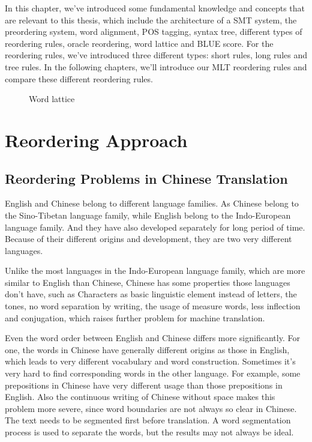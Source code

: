 In this chapter, we've introduced some fundamental knowledge and concepts that are relevant to this thesis, which include the architecture of a SMT system, the preordering system, word alignment, POS tagging, syntax tree, different types of reordering rules, oracle reordering, word lattice and BLUE score. For the reordering rules, we've introduced three different types: short rules, long rules and tree rules. In the following chapters, we'll introduce our MLT reordering rules and compare these different reordering rules.

\begin{landscape}
\begin{figure}
\centering

\caption{Word lattice}
\label{Lattices}
\end{figure}
\end{landscape}

\chapter{Reordering Approach}
\label{ch:ReorderingApproach}

\section{Reordering Problems in Chinese Translation}
\label{ch:ReorderingApproach:sec:Problem}

English and Chinese belong to different language families. As Chinese belong to the Sino-Tibetan language family, while English belong to the Indo-European language family. And they have also developed separately for long period of time. Because of their different origins and development, they are two very different languages.

Unlike the most languages in the Indo-European language family, which are more similar to English than Chinese, Chinese has some properties those languages don't have, such as Characters as basic linguistic element instead of letters, the tones, no word separation by writing, the usage of measure words, less inflection and conjugation, which raises further problem for machine translation.

Even the word order between English and Chinese differs more significantly. For one, the words in Chinese have generally different origins as those in English, which leads to very different vocabulary and word construction. Sometimes it's very hard to find corresponding words in the other language. For example, some prepositions in Chinese have very different usage than those prepositions in English. Also the continuous writing of Chinese without space makes this problem more severe, since word boundaries are not always so clear in Chinese. The text needs to be segmented first before translation. A word segmentation process is used to separate the words, but the results may not always be ideal.

